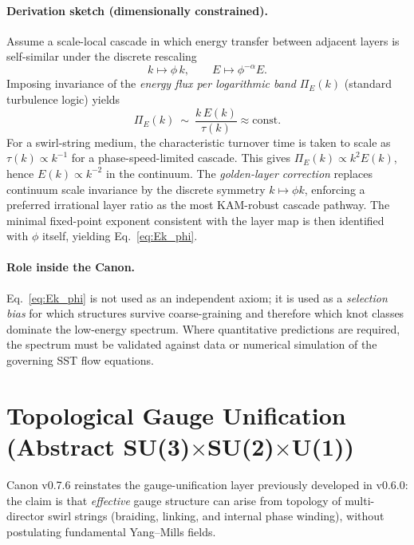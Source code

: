 \documentclass[10pt]{article}
\begin{document}
\paragraph{Derivation sketch (dimensionally constrained).}
Assume a scale-local cascade in which energy transfer between adjacent
layers is self-similar under the discrete rescaling
\begin{equation}
    k \mapsto \phi\,k,
    \qquad
    E \mapsto \phi^{-\alpha}E.
\end{equation}
Imposing invariance of the \emph{energy flux per logarithmic band}
$\Pi_E(k)$ (standard turbulence logic) yields
\begin{equation}
    \Pi_E(k)\ \sim\ \frac{k\,E(k)}{\tau(k)} \approx \text{const.}
\end{equation}
For a swirl-string medium, the characteristic turnover time is taken to scale
as $\tau(k)\propto k^{-1}$ for a phase-speed-limited cascade. This gives
$\Pi_E(k)\propto k^{2}E(k)$, hence $E(k)\propto k^{-2}$ in the continuum.
The \emph{golden-layer correction} replaces continuum scale invariance by the
discrete symmetry $k\mapsto\phi k$, enforcing a preferred irrational layer
ratio as the most KAM-robust cascade pathway. The minimal fixed-point exponent
consistent with the layer map is then identified with $\phi$ itself, yielding
Eq.~\eqref{eq:Ek_phi}.

\paragraph{Role inside the Canon.}
Eq.~\eqref{eq:Ek_phi} is not used as an independent axiom; it is used as a
\emph{selection bias} for which structures survive coarse-graining and therefore
which knot classes dominate the low-energy spectrum. Where quantitative
predictions are required, the spectrum must be validated against data or
numerical simulation of the governing SST flow equations.



    \section{Topological Gauge Unification (Abstract SU(3)$\times$SU(2)$\times$U(1))}
    \label{sec:gauge_unification}

Canon v0.7.6 reinstates the gauge-unification layer previously developed in v0.6.0:
the claim is that \emph{effective} gauge structure can arise from topology of
multi-director swirl strings (braiding, linking, and internal phase winding),
without postulating fundamental Yang--Mills fields.
\end{document}
